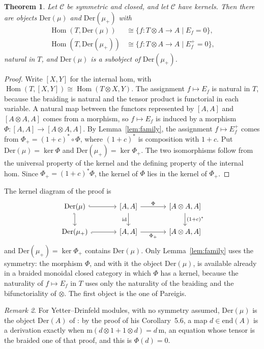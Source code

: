 \documentclass[]{interact}
\theoremstyle{plain}
\newtheorem{theorem}{Theorem}[section]
\theoremstyle{definition}
\theoremstyle{remark}
\newtheorem{remark}[theorem]{Remark}
\newcommand{\Der}{\mathrm{Der}}
\newcommand{\Hom}{\operatorname{Hom}}
\newcommand{\id}{\mathrm{id}}
\begin{document}
\begin{theorem}\label{thm:object}
Let $\mathcal{C}$ be symmetric and closed, and let $\mathcal{C}$ have kernels.
Then there are objects $\Der(\mu)$ and $\Der(\mu_+)$ with
\begin{align*}
\Hom(T, \Der(\mu)) &\cong \{ f \colon T \otimes A \to A \mid E_f = 0 \},\\
\Hom(T, \Der(\mu_+)) &\cong \{ f \colon T \otimes A \to A \mid E^+_f = 0 \},
\end{align*}
natural in $T$, and $\Der(\mu)$ is a subobject of $\Der(\mu_+)$.
\end{theorem}

\begin{proof}
Write $[X,Y]$ for the internal hom, with $\Hom(T, [X,Y]) \cong \Hom(T \otimes X, Y)$.
The assignment $f \mapsto E_f$ is natural in $T$, because the braiding is natural and the tensor product is functorial in each variable.
A natural map between the functors represented by $[A,A]$ and $[A \otimes A, A]$ comes from a morphism, so $f \mapsto E_f$ is induced by a morphism $\Phi \colon [A,A] \to [A \otimes A, A]$.
By Lemma~\ref{lem:family}, the assignment $f \mapsto E^+_f$ comes from $\Phi_+ = (1 + c)^* \circ \Phi$, where $(1 + c)^*$ is composition with $1 + c$.
Put $\Der(\mu) = \ker \Phi$ and $\Der(\mu_+) = \ker \Phi_+$.
The two isomorphisms follow from the universal property of the kernel and the defining property of the internal hom.
Since $\Phi_+ = (1 + c)^* \Phi$, the kernel of $\Phi$ lies in the kernel of $\Phi_+$.
\end{proof}

The kernel diagram of the proof is
\[
\begin{tikzcd}[column sep=large]
\Der(\mu) \arrow[r, hook] \arrow[d, hook'] & {[A,A]} \arrow[r, "\Phi"] \arrow[d, "\id"'] & {[A \otimes A, A]} \arrow[d, "(1 + c)^*"] \\
\Der(\mu_+) \arrow[r, hook'] & {[A,A]} \arrow[r, "\Phi_+"'] & {[A \otimes A, A]}
\end{tikzcd}
\]
and $\Der(\mu_+) = \ker \Phi_+$ contains $\Der(\mu)$.
Only Lemma~\ref{lem:family} uses the symmetry: the morphism $\Phi$, and with it the object $\Der(\mu)$, is available already in a braided monoidal closed category in which $\Phi$ has a kernel, because the naturality of $f \mapsto E_f$ in $T$ uses only the naturality of the braiding and the bifunctoriality of $\otimes$.
The first object is the one of Pareigis. %

\begin{remark}\label{rem:pareigis}
For Yetter--Drinfeld modules, with no symmetry assumed, $\Der(\mu)$ is the object $\mathrm{Der}(A)$ of \citet[Definition 5.5 and the paragraph following it]{Pareigis1998}: by the proof of his Corollary~5.6, a map $d \in \mathrm{end}(A)$ is a derivation exactly when $\mathrm m(d \otimes 1 + 1 \otimes d) = d\,\mathrm m$, an equation whose tensor is the braided one of that proof, and this is $\Phi(d) = 0$.
\end{remark}
\end{document}

